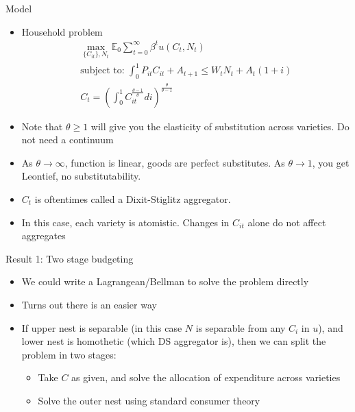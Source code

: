\documentclass[11pt,aspectratio=169,xcolor={dvipsnames},hyperref={pdftex,pdfpagemode=UseNone,hidelinks,pdfdisplaydoctitle=true},usepdftitle=false]{beamer}
\begin{document}
\begin{frame}{Model}
\begin{itemize}
\item Household problem
\begin{align*}
\max_{\{C_{it}\},N_t } \mathbb{E}_0 \sum_{t=0}^{\infty} \beta^t u(C_t,N_t)\\
\text{subject to:   } \int_0^1 P_{it} C_{it} + A_{t+1} \leq W_t N_t +  A_t(1+i)\\
C_t = \left(\int_0^1 C^{\frac{\theta-1}{\theta}}_{it} di \right)^{\frac{\theta}{\theta-1}}
\end{align*}
\item Note that $\theta \geq 1$ will give you the elasticity of substitution across varieties. Do not need a continuum
\item As $\theta \rightarrow \infty$, function is linear, goods are perfect substitutes. As $\theta \rightarrow 1$, you get Leontief, no substitutability.
\item $C_t$ is oftentimes called a Dixit-Stiglitz aggregator. 
\item In this case, each variety is atomistic. Changes in $C_{it}$ alone do not affect aggregates
\end{itemize}
\end{frame}


\begin{frame}{Result 1: Two stage budgeting}
\begin{itemize}
\item We could write a Lagrangean/Bellman to solve the problem directly
\item Turns out there is an easier way
\item If upper nest is separable (in this case $N$ is separable from any $C_{i}$ in $u$), and lower nest is homothetic (which DS aggregator is), then we can split the problem in two stages:
\begin{itemize}
\item Take $C$ as given, and solve the allocation of expenditure across varieties
\item Solve the outer nest using standard consumer theory
\end{itemize}
\end{itemize}
\end{frame}
\end{document}

